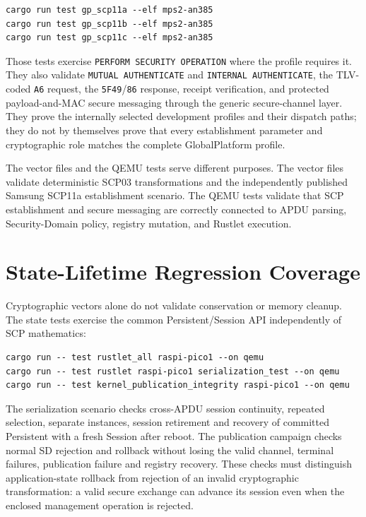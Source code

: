 \begin{verbatim}
cargo run test gp_scp11a --elf mps2-an385
cargo run test gp_scp11b --elf mps2-an385
cargo run test gp_scp11c --elf mps2-an385
\end{verbatim}

Those tests exercise \texttt{PERFORM SECURITY OPERATION} where the profile
requires it. They also validate \texttt{MUTUAL AUTHENTICATE} and
\texttt{INTERNAL AUTHENTICATE}, the TLV-coded \texttt{A6} request, the
\texttt{5F49}/\texttt{86} response, receipt verification, and protected
payload-and-MAC secure messaging through the generic secure-channel layer. They prove
the internally selected development profiles and their dispatch paths; they do
not by themselves prove that every establishment parameter and cryptographic
role matches the complete GlobalPlatform profile.

The vector files and the QEMU tests serve different purposes. The vector files
validate deterministic SCP03 transformations and the independently published
Samsung SCP11a establishment scenario. The QEMU tests
validate that SCP establishment and secure messaging are correctly connected to
APDU parsing, Security-Domain policy, registry mutation, and Rustlet execution.

\section{State-Lifetime Regression Coverage}

Cryptographic vectors alone do not validate conservation or memory cleanup.
The state tests exercise the common Persistent/Session API independently of
SCP mathematics:
\begin{verbatim}
cargo run -- test rustlet_all raspi-pico1 --on qemu
cargo run -- test rustlet raspi-pico1 serialization_test --on qemu
cargo run -- test kernel_publication_integrity raspi-pico1 --on qemu
\end{verbatim}

The serialization scenario checks cross-APDU session continuity, repeated
selection, separate instances, session retirement and recovery of committed
Persistent with a fresh Session after reboot. The publication campaign
checks normal SD rejection and rollback without losing the valid channel,
terminal failures, publication failure and registry recovery. These checks
must distinguish application-state rollback from rejection of an invalid
cryptographic transformation: a valid secure exchange can advance its
session even when the enclosed management operation is rejected.

